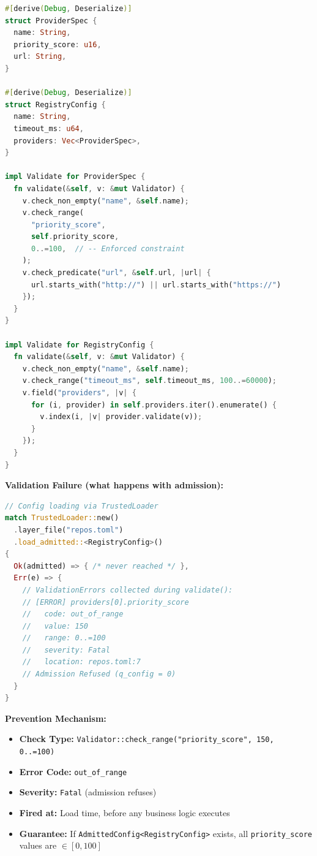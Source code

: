 \documentclass[11pt,a4paper]{article}
\begin{document}
\begin{lstlisting}[language=rust]
#[derive(Debug, Deserialize)]
struct ProviderSpec {
  name: String,
  priority_score: u16,
  url: String,
}

#[derive(Debug, Deserialize)]
struct RegistryConfig {
  name: String,
  timeout_ms: u64,
  providers: Vec<ProviderSpec>,
}

impl Validate for ProviderSpec {
  fn validate(&self, v: &mut Validator) {
    v.check_non_empty("name", &self.name);
    v.check_range(
      "priority_score",
      self.priority_score,
      0..=100,  // -- Enforced constraint
    );
    v.check_predicate("url", &self.url, |url| {
      url.starts_with("http://") || url.starts_with("https://")
    });
  }
}

impl Validate for RegistryConfig {
  fn validate(&self, v: &mut Validator) {
    v.check_non_empty("name", &self.name);
    v.check_range("timeout_ms", self.timeout_ms, 100..=60000);
    v.field("providers", |v| {
      for (i, provider) in self.providers.iter().enumerate() {
        v.index(i, |v| provider.validate(v));
      }
    });
  }
}
\end{lstlisting}

\textbf{Validation Failure (what happens with admission):}

\begin{lstlisting}[language=rust]
// Config loading via TrustedLoader
match TrustedLoader::new()
  .layer_file("repos.toml")
  .load_admitted::<RegistryConfig>()
{
  Ok(admitted) => { /* never reached */ },
  Err(e) => {
    // ValidationErrors collected during validate():
    // [ERROR] providers[0].priority_score
    //   code: out_of_range
    //   value: 150
    //   range: 0..=100
    //   severity: Fatal
    //   location: repos.toml:7
    // Admission Refused (q_config = 0)
  }
}
\end{lstlisting}

\textbf{Prevention Mechanism:}
\begin{itemize}
  \item \textbf{Check Type:} \texttt{Validator::check\_range("priority\_score", 150, 0..=100)}
  \item \textbf{Error Code:} \texttt{out\_of\_range}
  \item \textbf{Severity:} \texttt{Fatal} (admission refuses)
  \item \textbf{Fired at:} Load time, before any business logic executes
  \item \textbf{Guarantee:} If \texttt{AdmittedConfig<RegistryConfig>} exists, all \texttt{priority\_score} values are $\in [0, 100]$
\end{itemize}
\end{document}
